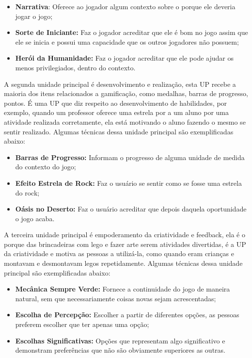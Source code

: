 \begin{itemize}
\item  \textbf{Narrativa}: Oferece ao jogador algum contexto sobre o porque ele deveria jogar o jogo;
\item  \textbf{Sorte de Iniciante:} Faz o jogador acreditar que ele é bom no jogo assim que ele se inicia e possui uma capacidade que os outros jogadores não possuem;
\item  \textbf{Herói da Humanidade:} Faz o jogador acreditar que ele pode ajudar os menos privilegiados, dentro do contexto.
\end{itemize}

A segunda unidade principal é desenvolvimento e realização, esta UP recebe a maioria dos itens relacionados a gamificação, como medalhas, barras de progresso, pontos. É uma UP que diz respeito ao desenvolvimento de habilidades, por exemplo, quando um professor oferece uma estrela por a um aluno por uma atividade realizada corretamente, ela está motivando o aluno fazendo o mesmo se sentir realizado. Algumas técnicas dessa unidade principal são exemplificadas abaixo:

\begin{itemize}
\item  \textbf{Barras de Progresso:} Informam o progresso de alguma unidade de medida do contexto do jogo;
\item  \textbf{Efeito Estrela de Rock:} Faz o usuário se sentir como se fosse uma estrela do rock;
\item  \textbf{Oásis no Deserto:} Faz o usuário acreditar que depois daquela oportunidade o jogo acaba.
\end{itemize}

A terceira unidade principal é empoderamento da criatividade e feedback, ela é o porque das brincadeiras com lego e fazer arte serem atividades divertidas, é a UP da criatividade e motiva as pessoas a utilizá-la, como quando eram crianças e montavam e desmontavam legos repetidamente. Algumas técnicas dessa unidade principal são exemplificadas abaixo:

\begin{itemize}
\item  \textbf{Mecânica Sempre Verde:} Fornece a continuidade do jogo de maneira natural, sem que necessariamente coisas novas sejam acrescentadas;
\item  \textbf{Escolha de Percepção:} Escolher a partir de diferentes opções, as pessoas preferem escolher que ter apenas uma opção;
\item  \textbf{Escolhas Significativas:} Opções que representam algo significativo e demonstram preferências que não são obviamente superiores as outras.
\end{itemize}

